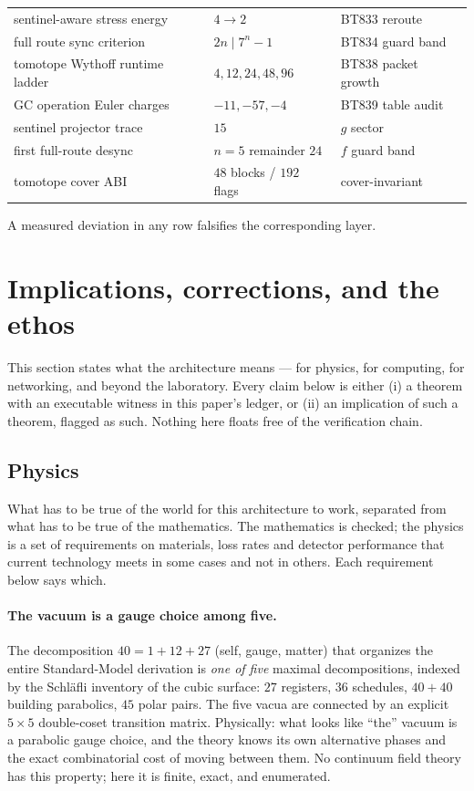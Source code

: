 \documentclass[11pt]{article}
\begin{document}
\begin{center}
\begin{tabular}{lll}
sentinel-aware stress energy & $4\to2$ & BT833 reroute\\
full route sync criterion & $2n\mid7^n-1$ & BT834 guard band\\
tomotope Wythoff runtime ladder & $4,12,24,48,96$ & BT838 packet growth\\
GC operation Euler charges & $-11,-57,-4$ & BT839 table audit\\
sentinel projector trace & $15$ & $g$ sector\\
first full-route desync & $n=5$ remainder $24$ & $f$ guard band\\
tomotope cover ABI & $48$ blocks / $192$ flags & cover-invariant\\
\bottomrule
\end{tabular}
\end{center}

A measured deviation in any row falsifies the corresponding layer.

\section{Implications, corrections, and the ethos}
\label{sec:implications}

This section states what the architecture means --- for physics, for
computing, for networking, and beyond the laboratory.  Every claim
below is either (i) a theorem with an executable witness in this
paper's ledger, or (ii) an implication of such a theorem, flagged as
such.  Nothing here floats free of the verification chain.

\subsection{Physics}

\begin{plainbox}
What has to be true of the world for this architecture to work, separated from
what has to be true of the mathematics. The mathematics is checked; the physics is a set of
requirements on materials, loss rates and detector performance that current technology meets
in some cases and not in others. Each requirement below says which.
\end{plainbox}


\paragraph{The vacuum is a gauge choice among five.}
The decomposition $40=1+12+27$ (self, gauge, matter) that organizes
the entire Standard-Model derivation is \emph{one of five} maximal
decompositions, indexed by the Schl\"afli inventory of the cubic
surface: $27$ registers, $36$ schedules, $40+40$ building parabolics,
$45$ polar pairs.  The five vacua are connected by an explicit $5
\times 5$ double-coset transition matrix.  Physically: what looks
like ``the'' vacuum is a parabolic gauge choice, and the theory knows
its own alternative phases and the exact combinatorial cost of moving
between them.  No continuum field theory has this property; here it
is finite, exact, and enumerated.
\end{document}
